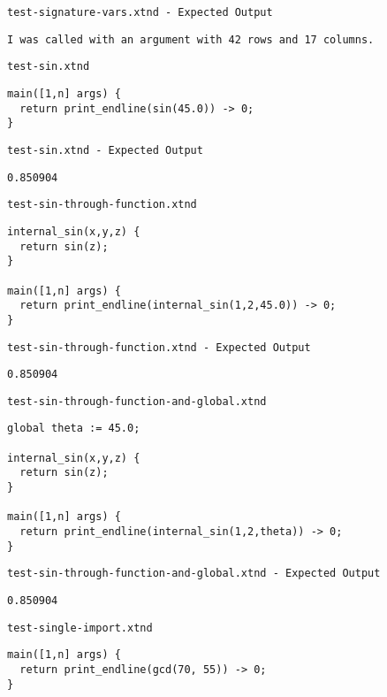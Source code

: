 \medskip \noindent \texttt{test-signature-vars.xtnd - Expected Output}


\begin{lstlisting}
I was called with an argument with 42 rows and 17 columns.
\end{lstlisting}


\medskip \noindent \texttt{test-sin.xtnd}


\begin{lstlisting}
main([1,n] args) {
  return print_endline(sin(45.0)) -> 0;
}
\end{lstlisting}


\medskip \noindent \texttt{test-sin.xtnd - Expected Output}


\begin{lstlisting}
0.850904
\end{lstlisting}


\medskip \noindent \texttt{test-sin-through-function.xtnd}


\begin{lstlisting}
internal_sin(x,y,z) {
  return sin(z);
}

main([1,n] args) {
  return print_endline(internal_sin(1,2,45.0)) -> 0;
}
\end{lstlisting}


\medskip \noindent \texttt{test-sin-through-function.xtnd - Expected Output}


\begin{lstlisting}
0.850904
\end{lstlisting}


\medskip \noindent \texttt{test-sin-through-function-and-global.xtnd}


\begin{lstlisting}
global theta := 45.0;

internal_sin(x,y,z) {
  return sin(z);
}

main([1,n] args) {
  return print_endline(internal_sin(1,2,theta)) -> 0;
}
\end{lstlisting}


\medskip \noindent \texttt{test-sin-through-function-and-global.xtnd - Expected Output}


\begin{lstlisting}
0.850904
\end{lstlisting}


\medskip \noindent \texttt{test-single-import.xtnd}


\begin{lstlisting}
main([1,n] args) {
  return print_endline(gcd(70, 55)) -> 0;
}
\end{lstlisting}


